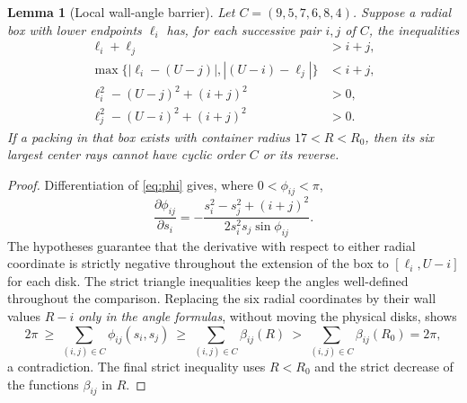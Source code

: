 \documentclass[11pt,a4paper]{article}
\newtheorem{lemma}[theorem]{Lemma}
\newcommand{\Rzero}{R_0}
\begin{document}
\begin{lemma}[Local wall-angle barrier]\label{lem:barrier}
Let $C=(9,5,7,6,8,4)$. Suppose a radial box with lower endpoints $\ell_i$ has, for each successive pair $i,j$ of $C$, the inequalities
\begin{align*}
\ell_i+\ell_j&>i+j,\\
\max\{|\ell_i-(U-j)|, |(U-i)-\ell_j|\}&<i+j,\\
\ell_i^2-(U-j)^2+(i+j)^2&>0,\\
\ell_j^2-(U-i)^2+(i+j)^2&>0.
\end{align*}
If a packing in that box exists with container radius $17<R<\Rzero$, then its six largest center rays cannot have cyclic order $C$ or its reverse.
\end{lemma}
\begin{proof}
Differentiation of \eqref{eq:phi} gives, where $0<\phi_{ij}<\pi$,
\[
\frac{\partial\phi_{ij}}{\partial s_i}
=-\frac{s_i^2-s_j^2+(i+j)^2}{2s_i^2s_j\sin\phi_{ij}}.
\]
The hypotheses guarantee that the derivative with respect to either radial coordinate is strictly negative throughout the extension of the box to $[\ell_i,U-i]$ for each disk. The strict triangle inequalities keep the angles well-defined throughout the comparison. Replacing the six radial coordinates by their wall values $R-i$ \emph{only in the angle formulas}, without moving the physical disks, shows
\[
2\pi\ \ge\ \sum_{(i,j)\in C}\phi_{ij}(s_i,s_j)
\ \ge\ \sum_{(i,j)\in C}\beta_{ij}(R)
\ >\ \sum_{(i,j)\in C}\beta_{ij}(\Rzero)=2\pi,
\]
a contradiction. The final strict inequality uses $R<\Rzero$ and the strict decrease of the functions $\beta_{ij}$ in $R$.
\end{proof}
\end{document}
